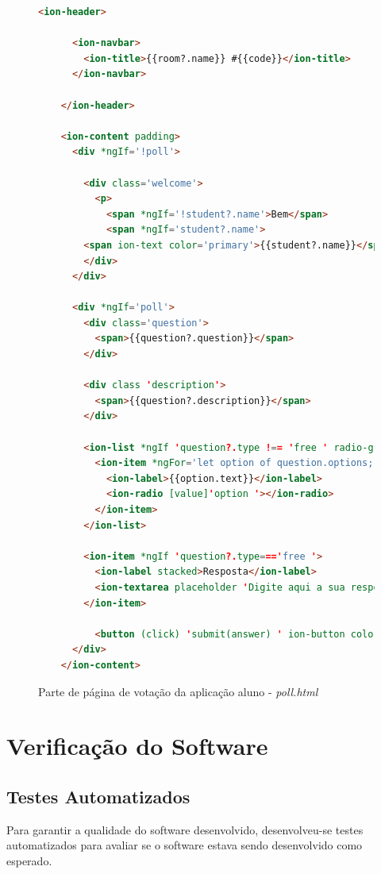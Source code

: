 \begin{figure}[!ht]
  \caption{Parte de página de votação da aplicação aluno - \textit{poll.html}}
  \label{fig:ionic_pollpage_html}
  \begin{lstlisting}[language=HTML]
    <ion-header>

      <ion-navbar>
        <ion-title>{{room?.name}} #{{code}}</ion-title>
      </ion-navbar>

    </ion-header>

    <ion-content padding>
      <div *ngIf='!poll'>

        <div class='welcome'>
          <p>
            <span *ngIf='!student?.name'>Bem</span>
            <span *ngIf='student?.name'>
        <span ion-text color='primary'>{{student?.name}}</span>, bem
        </div>
      </div>

      <div *ngIf='poll'>
        <div class='question'>
          <span>{{question?.question}}</span>
        </div>

        <div class 'description'>
          <span>{{question?.description}}</span>
        </div>

        <ion-list *ngIf 'question?.type !== 'free ' radio-group [(ngModel)]'answer '>
          <ion-item *ngFor='let option of question.options; let i=index '>
            <ion-label>{{option.text}}</ion-label>
            <ion-radio [value]'option '></ion-radio>
          </ion-item>
        </ion-list>

        <ion-item *ngIf 'question?.type==='free '>
          <ion-label stacked>Resposta</ion-label>
          <ion-textarea placeholder 'Digite aqui a sua resposta ' [(ngModel)] 'answer '></ion-textarea>
        </ion-item>

          <button (click) 'submit(answer) ' ion-button color 'primary ' full>ENVIAR</button>
      </div>
    </ion-content>
\end{lstlisting}
\doautor
\end{figure}

\section{Verificação do Software}

\subsection{Testes Automatizados}

Para garantir a qualidade do software desenvolvido, desenvolveu-se testes
automatizados para avaliar se o software estava sendo desenvolvido como esperado.


